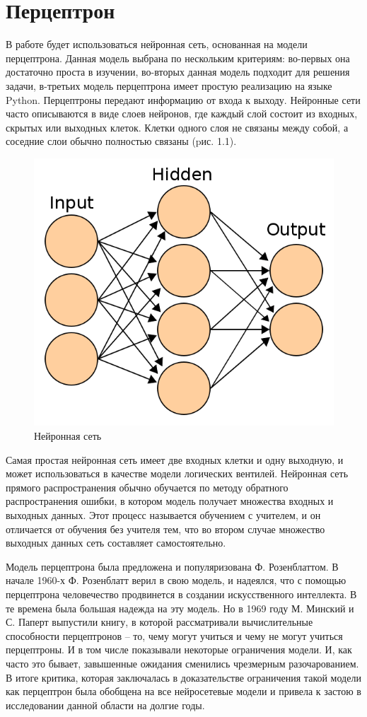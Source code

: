 \section{Перцептрон}

\indent \indent В работе будет использоваться нейронная сеть, основанная на модели перцептрона. Данная модель выбрана по нескольким критериям: во-первых она достаточно проста в изучении, во-вторых данная модель подходит для решения задачи, в-третьих модель перцептрона имеет простую реализацию на языке Python.  
Перцептроны передают информацию от входа к выходу. Нейронные сети часто описываются в виде слоев нейронов, где каждый слой состоит из входных, скрытых или выходных клеток. Клетки одного слоя не связаны между собой, а соседние слои обычно полностью связаны (pис. 1.1). 

\begin{figure}[h]
  \centering
  \includegraphics[width=0.5\linewidth]{./img/neural-network}
  \caption{Нейронная сеть}
  \label{fig:mpr}
\end{figure} 

Самая простая нейронная сеть имеет две входных клетки и одну выходную, и может использоваться в качестве модели логических вентилей. Нейронная сеть прямого распространения обычно обучается по методу обратного распространения ошибки, в котором модель получает множества входных и выходных данных. Этот процесс называется обучением с учителем, и он отличается от обучения без учителя тем, что во втором случае множество выходных данных сеть составляет самостоятельно.

Модель перцептрона была предложена и популяризована Ф. Розенблаттом. В начале 1960-х Ф. Розенблатт верил в свою модель, и надеялся, что с помощью перцептрона человечество продвинется в создании искусственного интеллекта. В те времена была большая надежда на эту модель. Но в 1969 году М. Минский и С. Паперт выпустили книгу, в которой рассматривали вычислительные способности перцептронов – то, чему могут учиться и чему не могут учиться перцептроны. И в том числе показывали некоторые ограничения модели. И, как часто это бывает, завышенные ожидания сменились чрезмерным разочарованием. В итоге критика, которая заключалась в доказательстве ограничения такой модели как перцептрон была обобщена на все нейросетевые модели и привела к застою в исследовании данной области на долгие годы.


